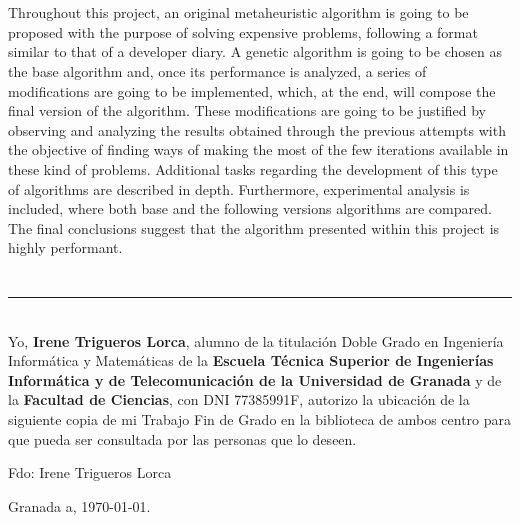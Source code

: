 \\

\vspace{0.7cm}
\\

Throughout this project, an original metaheuristic algorithm is going to be proposed with the purpose of solving expensive problems, following a format similar to that of a developer diary. 
A genetic algorithm is going to be chosen as the base algorithm and, once its performance is analyzed, a series of modifications are going  to be implemented, which, at the end, will compose the final version of the algorithm. 
These modifications are going to be justified by observing and analyzing the results obtained through the previous attempts with the objective of finding ways of making the most of the few iterations available in these kind of problems. 
Additional tasks regarding the development of this type of algorithms are described in depth. 
Furthermore, experimental analysis is included, where both base and the following versions algorithms are compared. 
The final conclusions suggest that the algorithm presented within this project is highly performant.

\chapter*{}
\thispagestyle{empty}

\noindent\rule[-1ex]{\textwidth}{2pt}\\[4.5ex]

Yo, \textbf{Irene Trigueros Lorca}, alumno de la titulación Doble Grado en Ingeniería Informática y Matemáticas de la \textbf{Escuela Técnica Superior
de Ingenierías Informática y de Telecomunicación de la Universidad de Granada} y de la \textbf{Facultad de Ciencias}, con DNI 77385991F, autorizo la
ubicación de la siguiente copia de mi Trabajo Fin de Grado en la biblioteca de ambos centro para que pueda ser
consultada por las personas que lo deseen.

\vspace{6cm}

\noindent Fdo: Irene Trigueros Lorca

\vspace{2cm}

\begin{flushright}
Granada a, \today.
\end{flushright}


